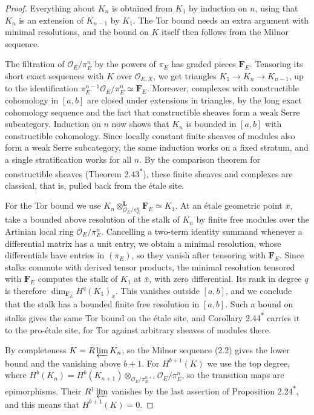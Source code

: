 \documentclass[11pt]{article}
\newcommand{\bpout}[1]{#1\textsuperscript{\hyperlink{bp-outside}{\ensuremath{\ast}}}}
\begin{document}
\begin{proof}[{Proof}]\label{bp17}%
Everything about \(K_n\) is obtained from \(K_1\) by induction on \(n\), using that \(K_n\) is an extension of \(K_{n-1}\) by \(K_1\). The Tor bound needs an extra argument with minimal resolutions, and the bound on \(K\) itself then follows from the Milnor sequence.

The filtration of \(\mathcal O_E/\pi_E^n\) by the powers of \(\pi_E\) has graded pieces \(\mathbf F_E\). Tensoring its short exact sequences with \(K\) over \(\mathcal O_{E,X}\), we get triangles \(K_1\to K_{n}\to K_{n-1}\), up to the identification \(\pi_E^{n-1}\mathcal O_E/\pi_E^n\simeq\mathbf F_E\). Moreover, complexes with constructible cohomology in \([a,b]\) are closed under extensions in triangles, by the long exact cohomology sequence and the fact that constructible sheaves form a weak Serre subcategory. Induction on \(n\) now shows that \(K_n\) is bounded in \([a,b]\) with constructible cohomology. Since locally constant finite sheaves of modules also form a weak Serre subcategory, the same induction works on a fixed stratum, and a single stratification works for all \(n\). By the comparison theorem for constructible sheaves (Theorem \bpout{2.43}), these finite sheaves and complexes are classical, that is, pulled back from the étale site.

For the Tor bound we use \(K_n\otimes^{\mathbf L}_{\mathcal O_E/\pi_E^n}\mathbf F_E\simeq K_1\). At an étale geometric point \(\bar x\), take a bounded above resolution of the stalk of \(K_n\) by finite free modules over the Artinian local ring \(\mathcal O_E/\pi_E^n\). Cancelling a two-term identity summand whenever a differential matrix has a unit entry, we obtain a minimal resolution, whose differentials have entries in \((\pi_E)\), so they vanish after tensoring with \(\mathbf F_E\). Since stalks commute with derived tensor products, the minimal resolution tensored with \(\mathbf F_E\) computes the stalk of \(K_1\) at \(\bar x\), with zero differential. Its rank in degree \(q\) is therefore \(\dim_{\mathbf F_E}H^q(K_1)_{\bar x}\). This vanishes outside \([a,b]\), and we conclude that the stalk has a bounded finite free resolution in \([a,b]\). Such a bound on stalks gives the same Tor bound on the étale site, and Corollary \bpout{2.44} carries it to the pro-étale site, for Tor against arbitrary sheaves of modules there.

By completeness \(K=R\varprojlim K_n\), so the Milnor sequence (2.2) gives the lower bound and the vanishing above \(b+1\). For \(H^{b+1}(K)\) we use the top degree, where \(H^b(K_n)=H^b(K_{n+1})\otimes_{\mathcal O_E/\pi_E^{n+1}}\mathcal O_E/\pi_E^n\), so the transition maps are epimorphisms. Their \(R^1\varprojlim\) vanishes by the last assertion of Proposition \bpout{2.24}, and this means that \(H^{b+1}(K)=0\).
\end{proof}
\end{document}
